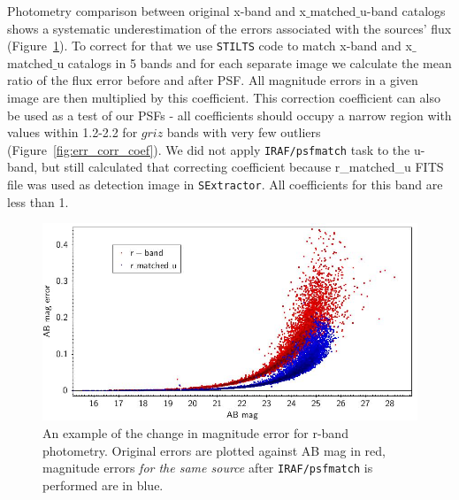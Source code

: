 Photometry comparison between original x-band and x$\_$matched$\_$u-band catalogs shows a systematic underestimation of the errors associated with the sources' flux (Figure~\ref{fig:err_corr}). To correct for that we use {\tt STILTS} code \citep{Taylor2006} to match x-band and x$\_$matched$\_$u catalogs in 5 bands and for each separate image we calculate the mean ratio of the flux error before and after PSF. 
All magnitude errors in a given image are then multiplied by this coefficient. This correction coefficient can also be used as a test of our PSFs - all coefficients should occupy a narrow region with values within 1.2-2.2 for $griz$ bands with very few outliers (Figure~\ref{fig:err_corr_coef}).
We did not apply {\tt IRAF/psfmatch} task to the u-band, but still calculated that correcting coefficient because r\_matched\_u FITS file was used as detection image in {\tt SExtractor}. All coefficients for this band are less than 1. 

\begin{figure}[!ht]
\includegraphics[width=6in]{Figures/error_correction_rband_example.jpg}
\caption{An example of the change in magnitude error for r-band photometry. Original errors are plotted against AB mag in red, magnitude errors \textit{for the same source} after {\tt IRAF/psfmatch} is performed are in blue.}
\label{fig:err_corr}
\end{figure}

